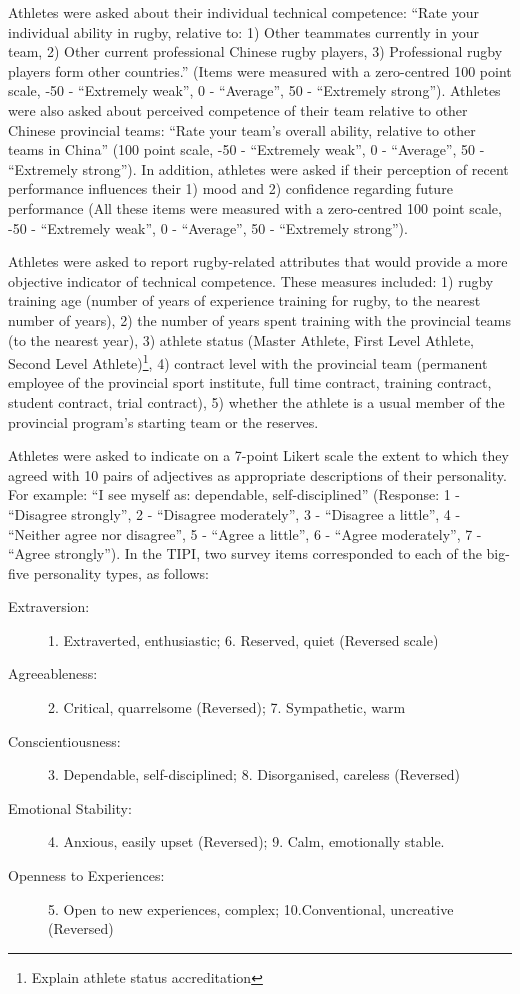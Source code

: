 Athletes were asked about their individual technical competence: ``Rate your individual ability in rugby, relative to: 1) Other teammates currently in your team, 2) Other current professional Chinese rugby players, 3) Professional rugby players form other countries.'' (Items were measured with a zero-centred 100 point scale, -50 - ``Extremely weak'', 0 - ``Average'', 50 - ``Extremely strong'').  Athletes were also asked about perceived competence of their team relative to other Chinese provincial teams: ``Rate your team's overall ability, relative to other teams in China'' (100 point scale, -50 - ``Extremely weak'', 0 - ``Average'', 50 - ``Extremely strong'').  In addition, athletes were asked if their perception of recent performance influences their 1) mood and 2) confidence regarding future performance (All these items were measured with a zero-centred 100 point scale, -50 - ``Extremely weak'', 0 - ``Average'', 50 - ``Extremely strong'').

Athletes were asked to report rugby-related attributes that would provide a more objective indicator of technical competence. These measures included: 1) rugby training age (number of years of experience training for rugby, to the nearest number of years), 2) the number of years spent training with the provincial teams (to the nearest year), 3) athlete status (Master Athlete, First Level Athlete, Second Level Athlete)\footnote{Explain athlete status accreditation}, 4) contract level with the provincial team (permanent employee of the provincial sport institute, full time contract, training contract, student contract, trial contract), 5) whether the athlete is a usual member of the provincial program's starting team or the reserves.


Athletes were asked to indicate on a 7-point Likert scale the extent to which they agreed with 10 pairs of adjectives as appropriate descriptions of their personality. For example: ``I see myself as: dependable, self-disciplined'' (Response: 1 - ``Disagree strongly'', 2 - ``Disagree moderately'',  3 - ``Disagree a little'', 4 - ``Neither agree nor disagree'', 5 - ``Agree a little'', 6 - ``Agree moderately'', 7 - ``Agree strongly''). In the TIPI, two survey items corresponded to each of the big-five personality types, as follows:

\begin{description}
\item [Extraversion:] 1. Extraverted, enthusiastic; 6. Reserved, quiet (Reversed scale)
\item [Agreeableness:] 2. Critical, quarrelsome (Reversed); 7. Sympathetic, warm
\item [Conscientiousness:] 3. Dependable, self-disciplined; 8. Disorganised, careless (Reversed)
\item [Emotional Stability:] 4. Anxious, easily upset (Reversed); 9. Calm, emotionally stable.
\item [Openness to Experiences:] 5. Open to new experiences, complex; 10.Conventional, uncreative (Reversed)
\end{description}


